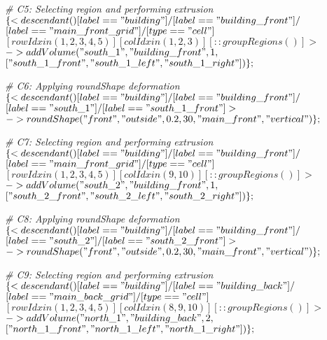 \noindent \textit{\# C5: Selecting region and performing extrusion}\\
$\{< descendant() [label=="building"] / [label=="building\_front"] / $\\
$[label=="main\_front\_grid"] / [type=="cell"] $\\
$[rowIdx in (1, 2, 3, 4, 5)] [colIdx in (1, 2, 3)] [::groupRegions()] > $\\
$-> addVolume("south\_1", "building\_front", 1, $\\
$["south\_1\_front", "south\_1\_left", "south\_1\_right"])\};$

\noindent \textit{\# C6: Applying roundShape deformation}\\
$\{< descendant() [label=="building"] / [label=="building\_front"] / $\\
$[label=="south\_1"] / [label=="south\_1\_front"] > $\\
$-> roundShape("front", "outside", 0.2, 30, "main\_front", "vertical")\};$

\noindent \textit{\# C7: Selecting region and performing extrusion}\\
$\{< descendant() [label=="building"] / [label=="building\_front"] / $\\
$[label=="main\_front\_grid"] / [type=="cell"] $\\
$[rowIdx in (1, 2, 3, 4, 5)] [colIdx in (9, 10)] [::groupRegions()] > $\\
$-> addVolume("south\_2", "building\_front", 1, $\\
$["south\_2\_front", "south\_2\_left", "south\_2\_right"])\};$

\noindent \textit{\# C8: Applying roundShape deformation}\\
$\{< descendant() [label=="building"] / [label=="building\_front"] / $\\
$[label=="south\_2"] / [label=="south\_2\_front"] > $\\
$-> roundShape("front", "outside", 0.2, 30, "main\_front", "vertical")\};$

\noindent \textit{\# C9: Selecting region and performing extrusion}\\
$\{< descendant() [label=="building"] / [label=="building\_back"] / $\\
$[label=="main\_back\_grid"] / [type=="cell"] $\\
$[rowIdx in (1, 2, 3, 4, 5)] [colIdx in (8, 9, 10)] [::groupRegions()] > $\\
$-> addVolume("north\_1", "building\_back", 2, $\\
$["north\_1\_front", "north\_1\_left", "north\_1\_right"])\};$

